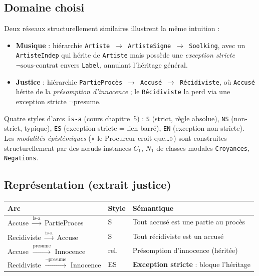 \documentclass[11pt, a4paper]{article}
\newcommand{\code}[1]{\texttt{#1}}
\begin{document}
\subsection*{Domaine choisi}

Deux réseaux structurellement similaires illustrent la même intuition :

\begin{itemize}
  \item \textbf{Musique} : hiérarchie \code{Artiste $\to$ ArtisteSigne $\to$
        Soolking}, avec un \code{ArtisteIndep} qui hérite de \code{Artiste}
        mais possède une \emph{exception stricte} $\lnot\text{sous-contrat}$
        envers \code{Label}, annulant l'héritage général.
  \item \textbf{Justice} : hiérarchie \code{PartieProcès $\to$ Accusé $\to$
        Récidiviste}, où \code{Accusé} hérite de la \emph{présomption
        d'innocence} ; le \code{Récidiviste} la perd via une exception stricte
        $\lnot\text{presume}$.
\end{itemize}

\noindent Quatre styles d'arcs \code{is-a} (cours chapitre~5) :
\code{S} (strict, règle absolue), \code{NS} (non-strict, typique),
\code{ES} (exception stricte = lien barré), \code{EN} (exception non-stricte).
Les \emph{modalités épistémiques} (« le Procureur croit que\dots ») sont
construites structurellement par des nœuds-instances $C_1$, $N_1$ de classes
modales \code{Croyances}, \code{Negations}.

\subsection*{Représentation (extrait justice)}

\begin{center}\small
\begin{tabular}{lll}
\toprule
\textbf{Arc} & \textbf{Style} & \textbf{Sémantique} \\
\midrule
Accuse $\xrightarrow{\text{is-a}}$ PartieProces          & S    & Tout accusé est une partie au procès \\
Recidiviste $\xrightarrow{\text{is-a}}$ Accuse           & S    & Tout récidiviste est un accusé \\
Accuse $\xrightarrow{\text{presume}}$ Innocence          & rel. & Présomption d'innocence (héritée) \\
Recidiviste $\xrightarrow{\lnot\text{presume}}$ Innocence & ES   & \textbf{Exception stricte} : bloque l'héritage \\
\bottomrule
\end{tabular}
\end{center}
\end{document}
